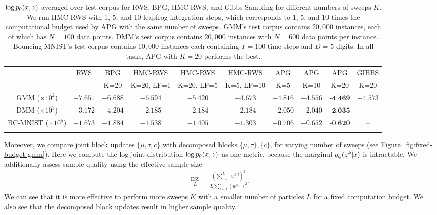 \documentclass{article}
\theoremstyle{definition}
\begin{document}
\begin{table}[t!]
    \centering
    \caption{$\log p_\theta (x, z)$ averaged over test corpus for RWS, BPG, HMC-RWS, and Gibbs Sampling for different numbers of sweeps $K$.
    We run HMC-RWS with 1, 5, and 10 leapfrog integration steps, which corresponds to 1, 5, and 10 times the computational budget used by APG with the same number of sweeps.
    GMM's test corpus contains $20,000$ instances, each of which has $N=100$ data points. DMM's test corpus contains $20,000$ instances with $N=600$ data points per instance. Bouncing MNIST's test corpus contains $10,000$ instances each containing $T=100$ time steps and $D=5$ digits.
    In all tasks, APG with $K=20$ performs the best.}
    \addtolength{\tabcolsep}{-2pt} 
    \begin{tabularx}{\textwidth}{cccccccccc}
    \toprule
     & RWS & BPG & HMC-RWS & HMC-RWS & HMC-RWS & APG & APG & APG & GIBBS \\
     & & K=20 & K=20, LF=1 & K=20, LF=5 & K=5, LF=10 & K=5 & K=10 & K=20 & K=20 \\
    \midrule
    GMM ($\times10^2$)& $-7.651$ & $-6.688$ & $-6.594$ & $-5.420$ & $-4.673$ & $-4.816$ & $-4.556$ & $\textbf{-4.469}$ & $-4.573$ \\
    DMM ($\times10^3$) & $-3.172$ & $-4.204$ & $-2.185$ & $-2.184$ & $-2.184$ & $-2.050$ & $-2.040$ & $\textbf{-2.035}$ & -- \\
    BC-MNIST ($\times10^5$) & $-1.673$ & $-1.884$ & $-1.538$ & $-1.405$ & $-1.303$ & $-0.706$ & $-0.652$ & $\textbf{-0.620}$ & --\\
    \bottomrule
    \vspace{-1em}
\end{tabularx}
\label{table:log-joint-all}
\end{table}

Moreover, we compare joint block updates $\{\mu, \tau, c\}$ with decomposed blocks $\{\mu, \tau\}, \{c\}$, for varying number of sweeps (see Figure~\ref{fig:fixed-budget-gmm}). Here we compute the log joint distribution $\log p_\theta(x, z)$ as one metric, because the marginal $q_\phi(z^k | x)$ is intractable.%
We additionally assess sample quality using the effective sample size
\begin{align*}
    \frac{\text{ESS}}{L} 
    = 
    \frac{(\sum_{l=1}^L w^{k,l})^2}
         {L \sum_{l=1}^L (w^{k,l})^2}
    .
\end{align*}
We can see that it is more effective to perform more sweeps $K$ with a smaller number of particles $L$ for a fixed computation budget. We also see that the decomposed block updates result in higher sample quality.
\end{document}
